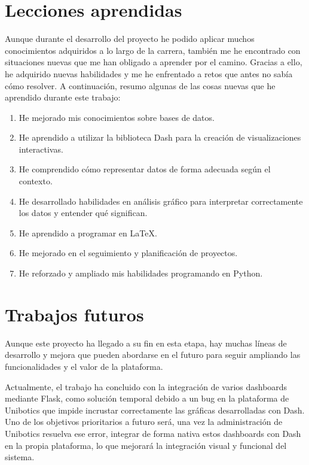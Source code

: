 \documentclass[a4paper, 12pt]{book}
\begin{document}
\section{Lecciones aprendidas}
\label{sec:lecciones_aprendidas}

Aunque durante el desarrollo del proyecto he podido aplicar muchos conocimientos adquiridos a lo largo de la carrera, también me he encontrado con situaciones nuevas que me han obligado a aprender por el camino. Gracias a ello, he adquirido nuevas habilidades y me he enfrentado a retos que antes no sabía cómo resolver. A continuación, resumo algunas de las cosas nuevas que he aprendido durante este trabajo:

\begin{enumerate}
    \item He mejorado mis conocimientos sobre bases de datos.
    \item He aprendido a utilizar la biblioteca Dash para la creación de visualizaciones interactivas.
    \item He comprendido cómo representar datos de forma adecuada según el contexto.
    \item He desarrollado habilidades en análisis gráfico para interpretar correctamente los datos y entender qué significan.
    \item He aprendido a programar en \LaTeX.
    \item He mejorado en el seguimiento y planificación de proyectos.
    \item He reforzado y ampliado mis habilidades programando en Python.
\end{enumerate}


\section{Trabajos futuros}
\label{sec:trabajos_futuros}

Aunque este proyecto ha llegado a su fin en esta etapa, hay muchas líneas de desarrollo y mejora que pueden abordarse en el futuro para seguir ampliando las funcionalidades y el valor de la plataforma.

Actualmente, el trabajo ha concluido con la integración de varios dashboards mediante Flask, como solución temporal debido a un bug en la plataforma de Unibotics que impide incrustar correctamente las gráficas desarrolladas con Dash. Uno de los objetivos prioritarios a futuro será, una vez la administración de Unibotics resuelva ese error, integrar de forma nativa estos dashboards con Dash en la propia plataforma, lo que mejorará la integración visual y funcional del sistema.
\end{document}
